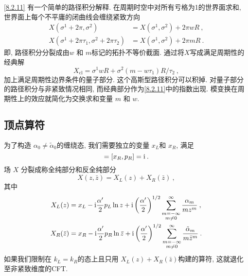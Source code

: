 \eqref{8.2.11} 有一个简单的路径积分解释. 在周期时空中对所有亏格为1的世界面求和, 世界面上每个不平庸的闭曲线会缠绕紧致方向
\begin{subequations} \label{8.2.12}
\begin{align}
X(\sigma^{1}+2 \pi, \sigma^{2}) &= X(\sigma^{1}, \sigma^{2})+2 \pi w R \:, \label{8.2.12a} \\
X(\sigma^{1}+2 \pi \tau_{1}, \sigma^{2}+2 \pi \tau_{2}) &= X(\sigma^{1}, \sigma^{2})+2 \pi m R \:. \label{8.2.12b} 
\end{align}
\end{subequations}
即, 路径积分分裂成由$w$ 和 $m $标记的拓扑不等价截面. 通过将$X$写成满足周期性的经典解                                                                                                              
\begin{equation}
	X_{\mathrm{cl}}=\sigma^{1} w R+\sigma^{2}(m-w \tau_{1}) R / \tau_{2} \:, \label{8.2.13}
\end{equation}
加上满足周期性边界条件的量子部分. 这个高斯型路径积分可以积掉. 对量子部分的路径积分与非紧致情况相同, 而经典部分作为\eqref{8.2.11}中的指数出现. 
模变换在周期性上的效应就简化为交换求和变量 $m$ 和 $w$.

\subsection*{顶点算符}
为了构造 $\alpha_{0} \neq \tilde{\alpha}_{0}$的缠绕态, 我们需要独立的变量 $x_{L}$和 $x_{R}$, 满足
\begin{equation}
	[x_{L}, p_{L}]=[x_{R}, p_{R}]=\mi \:. \label{8.2.14}
\end{equation}
场 $X$ 分裂成称全纯部分和反全纯部分
\begin{equation}
	X(z, \bar{z})=X_{L}(z)+X_{R}(\bar{z}) \:, \label{8.2.15}
\end{equation}
其中
\begin{subequations} \label{8.2.16}
\begin{align}
X_{L}(z) &= x_{L}- \mathrm{i} \frac{\alpha^{\prime}}{2} p_{L} \ln z+\mathrm{i}\left(\frac{\alpha^{\prime}}{2}\right)^{1 / 2} 
			\sum_{\substack{m=-\infty  \\  m \neq 0}}^{\infty} \frac{\alpha_{m}}{m z^{m}} \:, \label{8.2.16a} \\
X_{R}(\bar{z})&= x_{R}-\mathrm{i} \frac{\alpha^{\prime}}{2} p_{R} \ln \bar{z}+\mathrm{i}\left(\frac{\alpha^{\prime}}{2}\right)^{1 / 2} 
\sum_{\substack{m=-\infty  \\  m \neq 0}}^{\infty} \frac{\tilde{\alpha}_{m}}{m \bar{z}^{m}} \:. \label{8.2.16b}
\end{align}
\end{subequations}
如果我们限制在 $k_{L}=k_{R}$的态上且只用 $X_{L}(z)+X_{R}(\bar{z})$构建的算符, 这就退化至非紧致维度的CFT.

